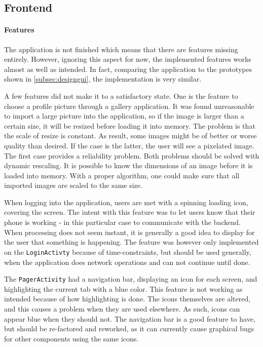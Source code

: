 \subsection{Frontend}
\label{subsec:frontend}

\paragraph{Features}
The application is not finished which means that there are features missing entirely. However, ignoring this aspect for now, the implemented features works almost as well as intended. In fact, comparing the application to the prototypes shown in \ref{subsec:designgui}, the implementation is very similar.

A few features did not make it to a satisfactory state. One is the feature to choose a profile picture through a gallery application. It was found unreasonable to import a large picture into the application, so if the image is larger than a certain size, it will be resized before loading it into memory. The problem is that the scale of resize is constant. As result, some images might be of better or worse quality than desired. If the case is the latter, the user will see a pixelated image. The first case provides a reliability problem.
Both problems should be solved with dynamic rescaling. It is possible to know the dimensions of an image before it is loaded into memory. With a proper algorithm, one could make sure that all imported images are scaled to the same size.

When logging into the application, users are met with a spinning loading icon, covering the screen. The intent with this feature was to let users know that their phone is working - in this particular case to communicate with the backend. When processing does not seem instant, it is generally a good idea to display for the user that something is happening.
The feature was however only implemented on the \texttt{LoginActivty} because of time-constraints, but should be used generally, when the application does network operations and can not continue until done.

The \texttt{PagerActivity} had a navigation bar, displaying an icon for each screen, and highlighting the current tab with a blue color. This feature is not working as intended because of how highlighting is done. The icons themselves are altered, and this causes a problem when they are used elsewhere. As such, icons can appear blue when they should not. The navigation bar is a good feature to have, but should be re-factored and reworked, as it can currently cause graphical bugs for other components using the same icons.


